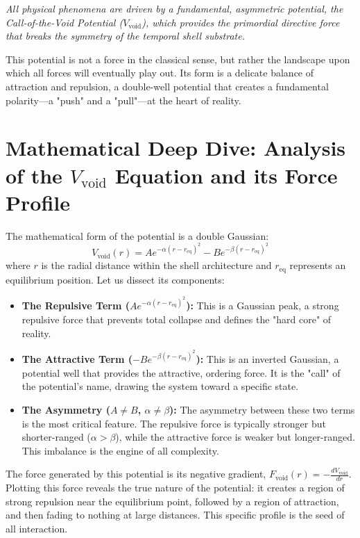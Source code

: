\documentclass[12pt]{report}
\begin{document}
\textit{All physical phenomena are driven by a fundamental, asymmetric potential, the Call-of-the-Void Potential ($V_{\text{void}}$), which provides the primordial directive force that breaks the symmetry of the temporal shell substrate.}

This potential is not a force in the classical sense, but rather the landscape upon which all forces will eventually play out. Its form is a delicate balance of attraction and repulsion, a double-well potential that creates a fundamental polarity—a "push" and a "pull"—at the heart of reality.

\section{Mathematical Deep Dive: Analysis of the \texorpdfstring{$V_{\text{void}}$}{V_void} Equation and its Force Profile}
The mathematical form of the potential is a double Gaussian:
\begin{equation}
V_{\text{void}}(r) = A e^{-\alpha(r-r_{\text{eq}})^2} - B e^{-\beta(r-r_{\text{eq}})^2}
\end{equation}
where $r$ is the radial distance within the shell architecture and $r_{\text{eq}}$ represents an equilibrium position. Let us dissect its components:
\begin{itemize}
    \item \textbf{The Repulsive Term ($A e^{-\alpha(r-r_{\text{eq}})^2}$):} This is a Gaussian peak, a strong repulsive force that prevents total collapse and defines the "hard core" of reality.
    \item \textbf{The Attractive Term ($-B e^{-\beta(r-r_{\text{eq}})^2}$):} This is an inverted Gaussian, a potential well that provides the attractive, ordering force. It is the "call" of the potential's name, drawing the system toward a specific state.
    \item \textbf{The Asymmetry ($A \neq B$, $\alpha \neq \beta$):} The asymmetry between these two terms is the most critical feature. The repulsive force is typically stronger but shorter-ranged ($\alpha > \beta$), while the attractive force is weaker but longer-ranged. This imbalance is the engine of all complexity.
\end{itemize}

The force generated by this potential is its negative gradient, $F_{\text{void}}(r) = - \frac{dV_{\text{void}}}{dr}$. Plotting this force reveals the true nature of the potential: it creates a region of strong repulsion near the equilibrium point, followed by a region of attraction, and then fading to nothing at large distances. This specific profile is the seed of all interaction.
\end{document}
